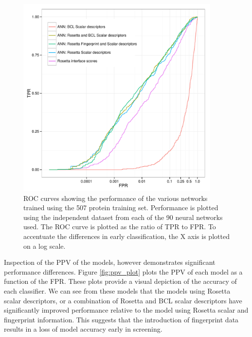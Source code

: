 \begin{figure}
\centering
\includegraphics[width=4in]{figures/hts/tpr_plot.pdf}
\caption{
\acs{ROC} curves showing the performance of the various networks trained using the 507 protein training set.
Performance is plotted using the independent dataset from each of the 90 neural networks used.
The \acs{ROC} curve is plotted as the ratio of \acs{TPR} to \acs{FPR}.
To accentuate the differences in early classification, the X axis is plotted on a log scale.
}
\label{fig:roc_plot}
\end{figure}
\begin{table}
\scriptsize
\renewcommand{\tabcolsep}{0.09cm}
\centering

\caption{
\acs{ROC-AUC} and average enrichment for the classification models being evaluated.
The Rosetta Interface Scores classifier uses only the sorted RosettaLigand interface scores for classification.
all "\acs{ANN}" classifiers are constructed as neural nets using the specified descriptors.
\acs{ROC-AUC} is the area under the \acs{ROC} curve generated from each descriptor (Figure \ref{fig:roc_plot})
Average enrichment is the average enrichment within the first 1\% of the each dataset.
}
\label{table:ann_performance}
\end{table}

Inspection of the \ac{PPV} of the models, however demonstrates significant performance differences.
Figure \ref{fig:ppv_plot} plots the \ac{PPV} of each model as a function of the \ac{FPR}.
These plots provide a visual depiction of the accuracy of each classifier.
We can see from these models that the models using Rosetta scalar descriptors, or a combination of Rosetta and \ac{BCL} scalar descriptors have significantly improved performance relative to the model using Rosetta scalar and fingerprint information.
This suggests that the introduction of fingerprint data results in a loss of model accuracy early in screening.

